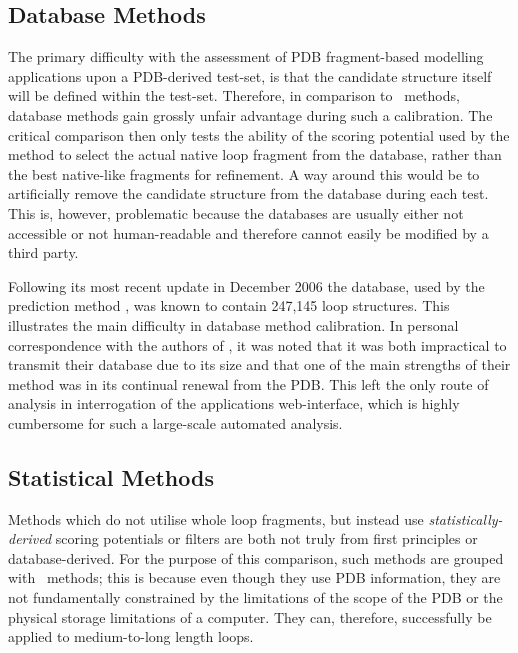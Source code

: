 \subsection{Database Methods}

The primary difficulty with the assessment of PDB fragment-based modelling applications upon
a PDB-derived test-set, is that the candidate structure itself will be defined within
the test-set. Therefore, in comparison to \abinitio\ methods,
database methods gain grossly unfair advantage during such a calibration. The critical comparison
then only tests the ability of the scoring potential used by the method to select the
actual native loop fragment from the database, rather than the best native-like fragments
for refinement.
A way around this would be to artificially remove the
candidate structure from the
database during each test. This is, however, problematic because the databases
are usually either not accessible or not human-readable and therefore cannot easily be modified by a third party.

Following its most recent update in December 2006 the \archdb\cite{METHOD:ArchDB:A} database, used
by the prediction method \archpred\cite{METHOD:ArchPRED}, was known to contain 247,145 loop structures. This illustrates the main difficulty in database method calibration. In personal
correspondence with the authors of \archpred, it was noted that it was both impractical to transmit their database due to its size and that one of the main strengths of their method was in its continual renewal from the PDB. This left the only route of analysis in interrogation of the applications web-interface,  which is highly cumbersome for such a large-scale automated analysis.


\subsection{Statistical Methods}

Methods which do not utilise whole loop fragments, but instead use \emph{statistically-derived} scoring potentials or filters are both not truly from first principles or database-derived. For the purpose of this comparison, such methods are grouped with \abinitio\ methods; this is because even though they use PDB information, they are not fundamentally constrained by the limitations of the scope of the PDB or the physical storage limitations of a computer. They can, therefore, successfully be applied to medium-to-long length loops.

